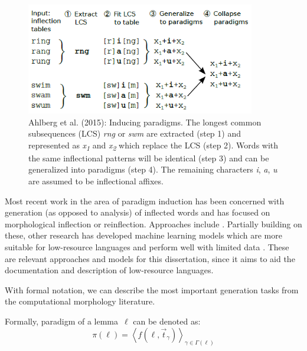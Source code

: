 \begin{figure}[tb]
\begin{center}
\includegraphics[width=10cm]{figs/Ahlberg2015-LCS.PNG}
\caption[Ahlberg et al. (2015)]{Ahlberg et al. (2015): Inducing paradigms. The longest common subsequences (LCS) \textit{rng} or \textit{swm} are extracted (step 1) and represented as \textit{x\textsubscript{1}} and \textit{x\textsubscript{2}} which replace the LCS (step 2). Words with the same inflectional patterns will be identical (step 3) and can be generalized into paradigms (step 4). The remaining characters \textit{i}, \textit{a}, \textit{u} are assumed to be inflectional affixes.}
\label{fig:LCS}
\end{center}
\end{figure}


Most recent work in the area of paradigm induction has been concerned with generation (as opposed to analysis) of inflected words and has focused on morphological inflection or reinflection. Approaches include \citet{durrett-denero-2013-supervised,nicolai-etal-2015-inflection,faruqui-etal-2016-morphological,kann-schutze-2016-single,aharoni-goldberg-2017-morphological}. Partially building on these, other research has developed machine learning models which are more suitable for low-resource languages and perform well with limited data \citep{kann-etal-2017-one,sharma-etal-2018-iit,makarov-clematide-2018-imitation,wu-cotterell-2019-exact,kann2020learning,wu2020applying}. These are relevant approaches and models for this dissertation, since it aims to aid the documentation and description of low-resource languages. 

With formal notation, we can describe the most important generation tasks from the computational morphology literature. 

Formally, paradigm of a lemma~$\ell$ can be denoted as:
\begin{equation}
    \pi(\ell) = \left\langle f(\ell, \vec{t}_\gamma)\right\rangle_{\gamma \in \Gamma(\ell)}
\end{equation}

